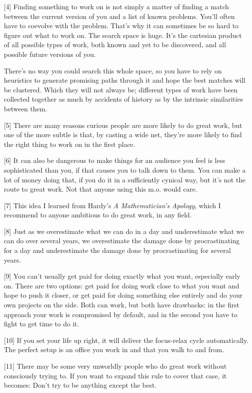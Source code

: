 {[}4{]} Finding something to work on is not simply a matter of finding a
match between the current version of you and a list of known problems.
You'll often have to coevolve with the problem. That's why it can
sometimes be so hard to figure out what to work on. The search space is
huge. It's the cartesian product of all possible types of work, both
known and yet to be discovered, and all possible future versions of you.

There's no way you could search this whole space, so you have to rely on
heuristics to generate promising paths through it and hope the best
matches will be clustered. Which they will not always be; different
types of work have been collected together as much by accidents of
history as by the intrinsic similarities between them.

{[}5{]} There are many reasons curious people are more likely to do
great work, but one of the more subtle is that, by casting a wide net,
they're more likely to find the right thing to work on in the first
place.

{[}6{]} It can also be dangerous to make things for an audience you feel
is less sophisticated than you, if that causes you to talk down to them.
You can make a lot of money doing that, if you do it in a sufficiently
cynical way, but it's not the route to great work. Not that anyone using
this m.o. would care.

{[}7{]} This idea I learned from Hardy's \emph{A Mathematician's
Apology}, which I recommend to anyone ambitious to do great work, in any
field.

{[}8{]} Just as we overestimate what we can do in a day and
underestimate what we can do over several years, we overestimate the
damage done by procrastinating for a day and underestimate the damage
done by procrastinating for several years.

{[}9{]} You can't usually get paid for doing exactly what you want,
especially early on. There are two options: get paid for doing work
close to what you want and hope to push it closer, or get paid for doing
something else entirely and do your own projects on the side. Both can
work, but both have drawbacks: in the first approach your work is
compromised by default, and in the second you have to fight to get time
to do it.

{[}10{]} If you set your life up right, it will deliver the focus-relax
cycle automatically. The perfect setup is an office you work in and that
you walk to and from.

{[}11{]} There may be some very unworldly people who do great work
without consciously trying to. If you want to expand this rule to cover
that case, it becomes: Don't try to be anything except the best.

